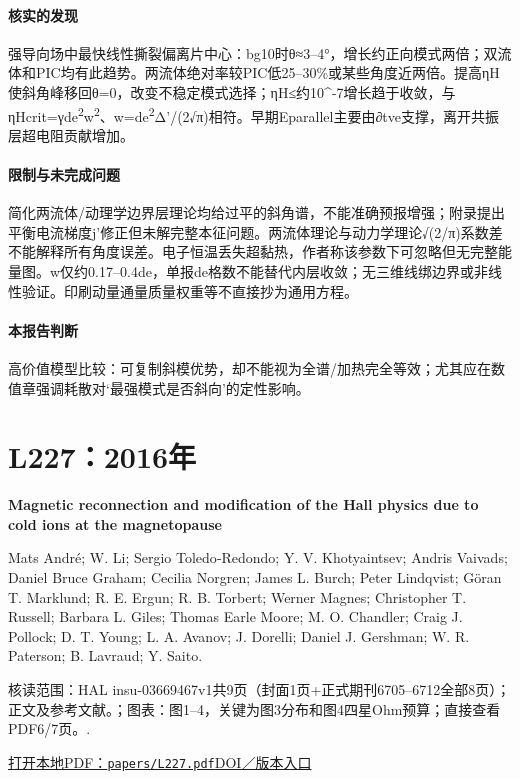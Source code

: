 \paragraph{核实的发现}强导向场中最快线性撕裂偏离片中心：bg10时θ≈3–4°，增长约正向模式两倍；双流体和PIC均有此趋势。两流体绝对率较PIC低25–30\%或某些角度近两倍。提高ηH使斜角峰移回θ=0，改变不稳定模式选择；ηH≤约10\textasciicircum{}-7增长趋于收敛，与ηHcrit=γde\textsuperscript{2}w\textsuperscript{2}、w=de\textsuperscript{2}Δ'/(2√π)相符。早期Eparallel主要由∂tve支撑，离开共振层超电阻贡献增加。

\paragraph{限制与未完成问题}简化两流体/动理学边界层理论均给过平的斜角谱，不能准确预报增强；附录提出平衡电流梯度j'修正但未解完整本征问题。两流体理论与动力学理论√(2/π)系数差不能解释所有角度误差。电子恒温丢失超黏热，作者称该参数下可忽略但无完整能量图。w仅约0.17–0.4de，单报de格数不能替代内层收敛；无三维线绑边界或非线性验证。印刷动量通量质量权重等不直接抄为通用方程。

\paragraph{本报告判断}高价值模型比较：可复制斜模优势，却不能视为全谱/加热完全等效；尤其应在数值章强调耗散对‘最强模式是否斜向’的定性影响。

\section{L227：2016年}\label{paper:L227}

\textbf{Magnetic reconnection and modification of the Hall physics due to cold ions at the magnetopause}\citep{L227}\

Mats André;  W. Li;  Sergio Toledo‐Redondo;  Y. V. Khotyaintsev;  Andris Vaivads;  Daniel Bruce Graham;  Cecilia Norgren;  James L. Burch;  Peter Lindqvist;  Göran T. Marklund;  R. E. Ergun;  R. B. Torbert;  Werner Magnes;  Christopher T. Russell;  Barbara L. Giles;  Thomas Earle Moore;  M. O. Chandler;  Craig J. Pollock;  D. T. Young;  L. A. Avanov;  J. Dorelli;  Daniel J. Gershman;  W. R. Paterson;  B. Lavraud;  Y. Saito.

\textsf{核读范围：}HAL insu-03669467v1共9页（封面1页+正式期刊6705–6712全部8页）；正文及参考文献。；\textsf{图表：}图1–4，关键为图3分布和图4四星Ohm预算；直接查看PDF6/7页。.

\href{run:papers/L227.pdf}{打开本地PDF：\texttt{papers/L227.pdf}}\quad\href{https://doi.org/10.1002/2016gl069665}{DOI／版本入口}

